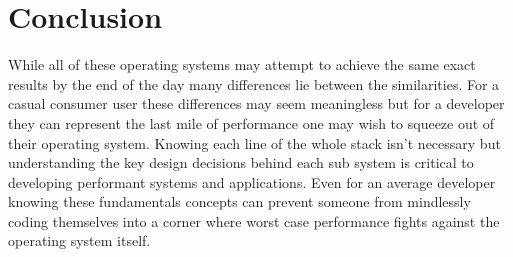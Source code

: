\documentclass[letterpaper,10pt,draftclsnofoot,onecolumn]{IEEEtran}
\begin{document}
\section{Conclusion}
While all of these operating systems may attempt to achieve the same exact results by the end of the day many differences lie between the similarities. For a casual consumer user these differences may seem meaningless but for a developer they can represent the last mile of performance one may wish to squeeze out of their operating system. Knowing each line of the whole stack isn’t necessary but understanding the key design decisions behind each sub system is critical to developing performant systems and applications. Even for an average developer knowing these fundamentals concepts can prevent someone from mindlessly coding themselves into a corner where worst case performance fights against the operating system itself.\\


\end{document}
